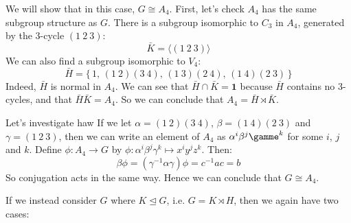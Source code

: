\documentclass[a4paper, oneside, 12pt, final]{article}
\theoremstyle{definition}
\begin{document}
\begin{enumerate}
        We will show that in this case, \(G \cong A_4\).
        First, let's check \(A_4\) has the same subgroup structure as \(G\).
        There is a subgroup isomorphic to \(C_3\) in \(A_4\), generated by the 3-cycle \((1\ 2\ 3)\):
        \[\bar{K} = \langle (1\ 2\ 3) \rangle\]
        We can also find a subgroup isomorphic to \(V_4\):
        \[\bar{H} = \{\,1,\, (1\ 2)(3\ 4),\, (1\ 3)(2\ 4),\, (1\ 4)(2\ 3)\,\}\]
        Indeed, \(\bar{H}\) is normal in \(A_4\).
        We can see that \(\bar{H} \cap \bar{K} = \bm{1}\) because \(\bar{H}\) contains no 3-cycles, and that
        \(\bar{H}\bar{K} = A_4\).
        So we can conclude that \(A_4 = \bar{H} \rtimes \bar{K}\).

        Let's investigate haw
        If we let \(\alpha = (1\ 2)(3\ 4)\), \(\beta = (1\ 4)(2\ 3)\) and \(\gamma = (1\ 2\ 3)\), then we can write an
        element of \(A_4\) as \(\alpha^i\beta^j\gamme^k\) for some \(i\), \(j\) and \(k\).
        Define \(\phi:A_4 \to G\) by \(\phi:\alpha^i\beta^j\gamma^k \mapsto x^{i}y^{j}z^{k}\).
        Then:
        \[\beta\phi = (\gamma^{-1}\alpha\gamma)\phi = c^{-1}ac = b\]
        So conjugation acts in the same way.
        Hence we can conclude that \(G \cong A_4\).
\end{enumerate}

If we instead consider \(G\) where \(K \unlhd G\), i.e. \(G = K \rtimes H\), then we again have two cases:
\end{document}

